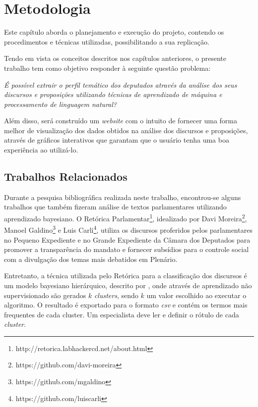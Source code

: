 \chapter{Metodologia}

Este capítulo aborda o planejamento e execução do projeto, contendo os procedimentos e técnicas utilizadas, possibilitando a sua  replicação.

Tendo em vista os conceitos descritos nos capítulos anteriores, o presente trabalho tem como objetivo responder à seguinte questão problema:

\begin{center}
\textit{É possível extrair o perfil temático dos deputados através da análise dos seus discursos e proposições utilizando técnicas de aprendizado de máquina e processamento de linguagem natural?}
\end{center}

Além disso, será construído um \textit{website} com o intuito de fornecer uma forma melhor de visualização dos dados obtidos na análise dos discursos e proposições, através de gráficos interativos que garantam que o usuário tenha uma boa experiência ao utilizá-lo.


\section{Trabalhos Relacionados}

Durante a pesquisa bibliográfica realizada neste trabalho, encontrou-se alguns trabalhos que também fizeram análise de textos parlamentares utilizando aprendizado bayesiano. O Retórica Parlamentar\footnote{http://retorica.labhackercd.net/about.html}, idealizado por Davi Moreira\footnote{https://github.com/davi-moreira}, Manoel Galdino\footnote{https://github.com/mgaldino} e Luis Carli\footnote{https://github.com/luiscarli}, utiliza os discursos proferidos pelos parlamentares no Pequeno Expediente e no Grande Expediente da Câmara dos Deputados para promover a transparência do mandato e fornecer subsídios para o controle social com a divulgação dos temas mais debatidos em Plenário.

Entretanto, a técnica utilizada pelo Retórica para a classificação dos discursos é um modelo bayesiano hierárquico, descrito por , onde através de aprendizado não supervisionado são gerados \(k\) \textit{clusters}, sendo \(k\) um valor escolhido ao executar o algoritmo. O resultado é exportado para o formato \textit{csv} e contém os termos mais frequentes de cada cluster. Um especialista deve ler e definir o rótulo de cada \textit{cluster}.

